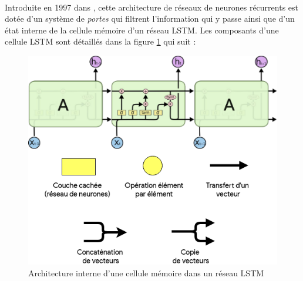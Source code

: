\paragraph{}
Introduite en 1997 dans \citep{lstm_original_paper}, cette architecture de réseaux de neurones récurrents est dotée d'un système de \textit{portes} qui filtrent l'information qui y passe ainsi que d'un état interne de la cellule mémoire d'un réseau LSTM. Les composants d'une cellule LSTM  sont détaillés dans la figure \ref{lstm_architecture} qui suit : 
\begin{figure}[h]
	\centering
	\includegraphics[width=0.5\linewidth]{images/notions/lstm_arch.png}
	\caption{Architecture interne d'une cellule mémoire dans un réseau LSTM \citep{rnns_online}}
	\label{lstm_architecture}
\end{figure}
